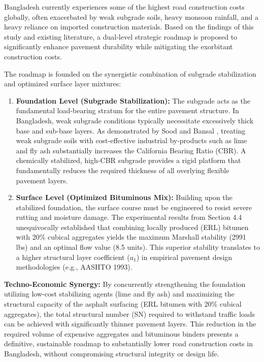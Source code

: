 \documentclass[12pt,a4paper]{article}
\begin{document}
Bangladesh currently experiences some of the highest road construction costs globally, often exacerbated by weak subgrade soils, heavy monsoon rainfall, and a heavy reliance on imported construction materials. Based on the findings of this study and existing literature, a dual-level strategic roadmap is proposed to significantly enhance pavement durability while mitigating the exorbitant construction costs.

The roadmap is founded on the synergistic combination of subgrade stabilization and optimized surface layer mixtures:

\begin{enumerate}
    \item \textbf{Foundation Level (Subgrade Stabilization):} The subgrade acts as the fundamental load-bearing stratum for the entire pavement structure. In Bangladesh, weak subgrade conditions typically necessitate excessively thick base and sub-base layers. As demonstrated by Sood and Bansal \cite{sood2015evaluation}, treating weak subgrade soils with cost-effective industrial by-products such as lime and fly ash substantially increases the California Bearing Ratio (CBR). A chemically stabilized, high-CBR subgrade provides a rigid platform that fundamentally reduces the required thickness of all overlying flexible pavement layers.
    \item \textbf{Surface Level (Optimized Bituminous Mix):} Building upon the stabilized foundation, the surface course must be engineered to resist severe rutting and moisture damage. The experimental results from Section 4.4 unequivocally established that combining locally produced (ERL) bitumen with 20\% cubical aggregates yields the maximum Marshall stability (2991 lbs) and an optimal flow value (8.5 units). This superior stability translates to a higher structural layer coefficient ($a_1$) in empirical pavement design methodologies (e.g., AASHTO 1993).
\end{enumerate}

\textbf{Techno-Economic Synergy:}
By concurrently strengthening the foundation utilizing low-cost stabilizing agents (lime and fly ash) and maximizing the structural capacity of the asphalt surfacing (ERL bitumen with 20\% cubical aggregates), the total structural number (SN) required to withstand traffic loads can be achieved with significantly thinner pavement layers. This reduction in the required volume of expensive aggregates and bituminous binders presents a definitive, sustainable roadmap to substantially lower road construction costs in Bangladesh, without compromising structural integrity or design life.
\end{document}
